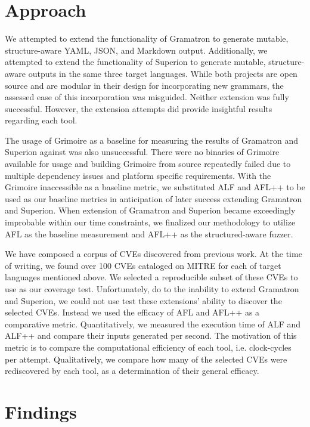 \documentclass[12pt]{diazessay}
\begin{document}
\vspace{3mm}
\section*{Approach}

We attempted to extend the functionality of Gramatron to generate mutable, structure-aware YAML, JSON, and Markdown output.
Additionally, we attempted to extend the functionality of Superion to generate mutable, structure-aware outputs in the same three target languages.
While both projects are open source and are modular in their design for incorporating new grammars, the assessed ease of this incorporation was misguided.
Neither extension was fully successful.
However, the extension attempts did provide insightful results regarding each tool.

The usage of Grimoire as a baseline for measuring the results of Gramatron and Superion against was also unsuccessful.
There were no binaries of Grimoire available for usage and building Grimoire from source repeatedly failed due to multiple dependency issues and platform specific requirements.
With the Grimoire inaccessible as a baseline metric, we substituted ALF and AFL++ to be used as our baseline metrics in anticipation of later success extending Gramatron and Superion.
When extension of Gramatron and Superion became exceedingly improbable within our time constraints, we finalized our methodology to utilize AFL as the baseline measurement and AFL++ as the structured-aware fuzzer.

We have composed a corpus of CVEs discovered from previous work.
At the time of writing, we found over 100 CVEs cataloged on MITRE\cite{MITRE} for each of target languages mentioned above.
We selected a reproducible subset of these CVEs to use as our coverage test.
Unfortunately, do to the inability to extend Gramatron and Superion, we could not use test these extensions' ability to discover the selected CVEs.
Instead we used the efficacy of AFL and AFL++ as a comparative metric.
Quantitatively, we measured the execution time of ALF and ALF++ and compare their inputs generated per second.
The motivation of this metric is to compare the computational efficiency of each tool, i.e. clock-cycles per attempt.
Qualitatively, we compare how many of the selected CVEs were rediscovered by each tool, as a determination of their general efficacy.

\section*{Findings}
\label{results}
\end{document}
